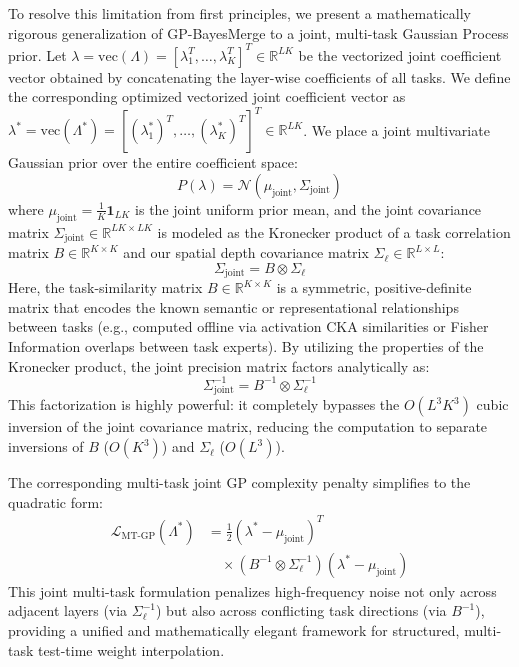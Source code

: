 To resolve this limitation from first principles, we present a mathematically
rigorous generalization of GP-BayesMerge to a joint, multi-task Gaussian Process
prior. Let $\lambda = \text{vec}(\Lambda) = [ \lambda_1^T, \dots, \lambda_K^T ]^T \in \mathbb{R}^{LK}$
be the vectorized joint coefficient vector obtained by concatenating the layer-wise coefficients of all tasks.
We define the corresponding optimized vectorized joint coefficient vector as $\lambda^* = \text{vec}(\Lambda^*) = [ (\lambda_1^*)^T, \dots, (\lambda_K^*)^T ]^T \in \mathbb{R}^{LK}$. We place a joint multivariate Gaussian prior over the entire
coefficient space:
\begin{equation}
P( \lambda ) = \mathcal{N}\left( \mu_{\text{joint}}, \Sigma_{\text{joint}} \right)
\end{equation}
where $\mu_{\text{joint}} = \frac{1}{K} \mathbf{1}_{LK}$ is the joint uniform
prior mean, and the joint covariance matrix $\Sigma_{\text{joint}} \in
\mathbb{R}^{LK \times LK}$ is modeled as the Kronecker product of a task
correlation matrix $B \in \mathbb{R}^{K \times K}$ and our spatial depth
covariance matrix $\Sigma_{\ell} \in \mathbb{R}^{L \times L}$:
\begin{equation}
\Sigma_{\text{joint}} = B \otimes \Sigma_{\ell}
\end{equation}
Here, the task-similarity matrix $B \in \mathbb{R}^{K \times K}$ is a symmetric,
positive-definite matrix that encodes the known semantic or representational
relationships between tasks (e.g., computed offline via activation CKA
similarities or Fisher Information overlaps between task experts). By utilizing
the properties of the Kronecker product, the joint precision matrix factors
analytically as:
\begin{equation}
\Sigma_{\text{joint}}^{-1} = B^{-1} \otimes \Sigma_{\ell}^{-1}
\label{eq:kronecker_precision}
\end{equation}
This factorization is highly powerful: it completely bypasses the $O(L^3 K^3)$
cubic inversion of the joint covariance matrix, reducing the computation to
separate inversions of $B$ ($O(K^3)$) and $\Sigma_{\ell}$ ($O(L^3)$).

The corresponding multi-task joint GP complexity penalty simplifies to the quadratic form:
\begin{equation}
\label{eq:multitask_gp_penalty}
\begin{aligned}
\mathcal{L}_{\text{MT-GP}}(\Lambda^*) &= \frac{1}{2} (\lambda^* - \mu_{\text{joint}})^T \\
&\quad \times \left( B^{-1} \otimes \Sigma_{\ell}^{-1} \right) (\lambda^* - \mu_{\text{joint}})
\end{aligned}
\end{equation}
This joint multi-task formulation penalizes high-frequency noise not only across
adjacent layers (via $\Sigma_{\ell}^{-1}$) but also across conflicting task
directions (via $B^{-1}$), providing a unified and mathematically elegant
framework for structured, multi-task test-time weight interpolation.

